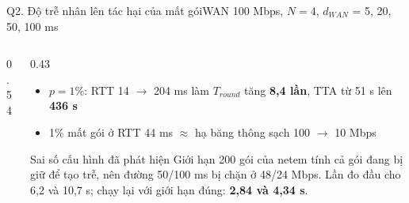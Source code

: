 \documentclass[aspectratio=169,10pt]{beamer}
\begin{document}
\begin{frame}{Q2. Độ trễ nhân lên tác hại của mất gói}{WAN 100 Mbps, $N = 4$, $d_{WAN}$ = 5, 20, 50, 100 ms}
  \begin{columns}[c]
    \begin{column}{0.54\textwidth}
      \centering
    \end{column}
    \begin{column}{0.43\textwidth}
      \begin{itemize}\footnotesize
        \item $p = 1\%$: RTT 14 $\to$ 204 ms làm $T_{round}$ tăng \textbf{8,4 lần}, TTA từ 51 s lên \textbf{436 s}
        \item 1\% mất gói ở RTT 44 ms $\approx$ hạ băng thông sạch 100 $\to$ 10 Mbps
      \end{itemize}
      \begin{alertblock}{Sai số cấu hình đã phát hiện}
        \footnotesize Giới hạn 200 gói của netem tính cả gói đang bị giữ để tạo trễ, nên đường 50/100 ms bị chặn ở 48/24 Mbps. Lần đo đầu cho 6,2 và 10,7 s; chạy lại với giới hạn đúng: \textbf{2,84 và 4,34 s}.
      \end{alertblock}
    \end{column}
  \end{columns}
\end{frame}
\end{document}

